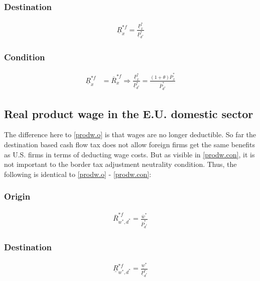 \subsubsection*{Destination}
\begin{equation}\label{xproeu.d}
\begin{aligned}
\underline R^{*f}_x = \frac{\underline P^*_x}{\underline P^*_{d^*}}\end{aligned}  \end{equation}

\subsubsection*{Condition}
\begin{equation}\label{xproeu.con} 
\begin{aligned}
    \underline R^{*f}_x &= \overline R^{*f}_x \Rightarrow \frac{\underline P^*_x}{\underline P^*_{d^*}} = \frac{ \left( 1+\theta \right) \overline P^*_x}{\overline P^*_{d^*}}
\end{aligned}  
\end{equation}

\subsection*{Real product wage in the E.U. domestic sector}
The difference here to \eqref{prodw.o} is that wages are no longer deductible. So far the destination based cash flow tax does not allow foreign firms get the same benefits as U.S. firms in terms of deducting wage costs. But as visible in \eqref{prodw.con}, it is not important to the border tax adjustment neutrality condition. Thus, the following is identical to \eqref{prodw.o} - \eqref{prodw.con}:

\subsubsection*{Origin}
\begin{equation}\label{prodweu.o}
\begin{aligned}
\overline R^{*f}_{w^*, d^*} = \frac{\overline w^*}{\overline P^*_{d^*}}
\end{aligned}  
\end{equation}

\subsubsection*{Destination}
\begin{equation}\label{prodweu.d}
\begin{aligned}
\underline R^{*f}_{w^*, d^*} = \frac{\underline w^*}{\underline P^*_{d^*}}
\end{aligned}  
\end{equation}

